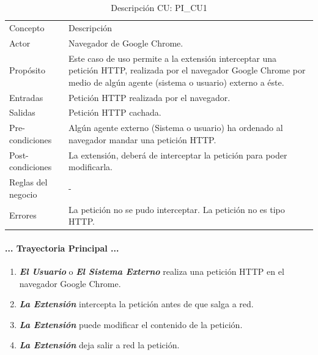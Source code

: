 \documentclass[12pt, a4paper, titlepage]{article}
\begin{document}
				\begin{table}[htb]
				\begin{tabular}{ |p{3.5cm}||p{9.5cm}|}
					\hline
					\rowcolor{guindapoli}
					\multicolumn{2}{|c|}{\textbf{\textcolor{white}{Caso de uso: PI\_CU1. Interceptar petición.}}}\\
					\hline
					\rowcolor{azulfuerte}Concepto & Descripción\\
					\hline
					\cellcolor{azulclaro}Actor & 
					Navegador de Google Chrome.\\ 
					\hline
					\cellcolor{azulclaro}Propósito &
					Este caso de uso permite a la extensión interceptar una petición HTTP, realizada por el navegador Google Chrome por medio de algún agente (sistema o usuario) externo a éste.\\
					\hline
					\cellcolor{azulclaro}Entradas &
					Petición HTTP realizada por el navegador.\\
					\hline
					\cellcolor{azulclaro}Salidas &
					Petición HTTP cachada.\\
					\hline
					\cellcolor{azulclaro}Pre-condiciones&
					Algún agente externo (Sistema o usuario) ha ordenado al navegador mandar una petición HTTP.\\
					\hline
					\cellcolor{azulclaro}Post-condiciones&
					La extensión, deberá de interceptar la petición para poder modificarla.\\
					\hline
					\cellcolor{azulclaro}Reglas del negocio&
					-\\
					\hline
					\cellcolor{azulclaro}Errores &
					La petición no se pudo interceptar. \newline La petición no es tipo HTTP.\\					
					\hline
				\end{tabular}
				\caption[DCU: PI\_CU1]{Descripción CU: PI\_CU1}
				\end{table}
				
				\paragraph{... Trayectoria Principal ...}
				\begin{enumerate}
					\item \textbf{\textit{El Usuario}} o \textbf{\textit{El Sistema Externo}} realiza una petición HTTP en el navegador Google Chrome.\\
					\item \textbf{\textit{La Extensión}} intercepta la petición antes de que salga a red.\\
					\item \textbf{\textit{La Extensión}} puede modificar el contenido de la petición. \\
					\item \textbf{\textit{La Extensión}} deja salir a red la petición.
				\end{enumerate}
\end{document}

